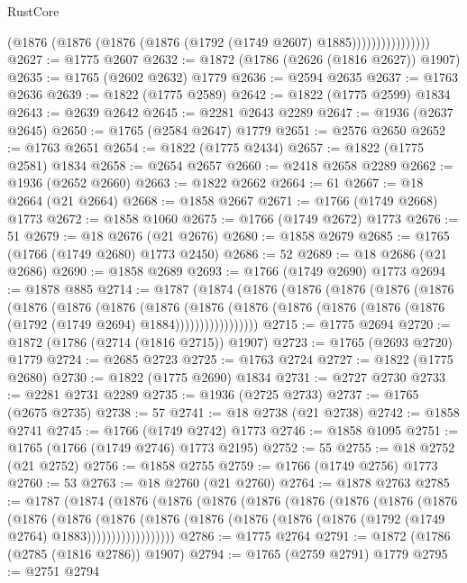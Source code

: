 \begin{lexlean}{RustCore}
\begin{coremodule}
                          (@1876 (@1876 (@1876 (@1876 (@1792 (@1749 @2607) @1885))))))))))))))))
@2627 := @1775 @2607
@2632 := @1872 (@1786 (@2626 (@1816 @2627)) @1907)
@2635 := @1765 (@2602 @2632) @1779
@2636 := @2594 @2635
@2637 := @1763 @2636
@2639 := @1822 (@1775 @2589)
@2642 := @1822 (@1775 @2599) @1834
@2643 := @2639 @2642
@2645 := @2281 @2643 @2289
@2647 := @1936 (@2637 @2645)
@2650 := @1765 (@2584 @2647) @1779
@2651 := @2576 @2650
@2652 := @1763 @2651
@2654 := @1822 (@1775 @2434)
@2657 := @1822 (@1775 @2581) @1834
@2658 := @2654 @2657
@2660 := @2418 @2658 @2289
@2662 := @1936 (@2652 @2660)
@2663 := @1822 @2662
@2664 := 61
@2667 := @18 @2664 (@21 @2664)
@2668 := @1858 @2667
@2671 := @1766 (@1749 @2668) @1773
@2672 := @1858 @1060
@2675 := @1766 (@1749 @2672) @1773
@2676 := 51
@2679 := @18 @2676 (@21 @2676)
@2680 := @1858 @2679
@2685 := @1765 (@1766 (@1749 @2680) @1773 @2450)
@2686 := 52
@2689 := @18 @2686 (@21 @2686)
@2690 := @1858 @2689
@2693 := @1766 (@1749 @2690) @1773
@2694 := @1878 @885
@2714 := @1787
    (@1874
      (@1876
        (@1876
          (@1876
            (@1876
              (@1876
                (@1876
                  (@1876
                    (@1876
                      (@1876
                        (@1876
                          (@1876
                            (@1876 (@1876 (@1876 (@1876 (@1792 (@1749 @2694) @1884)))))))))))))))))
@2715 := @1775 @2694
@2720 := @1872 (@1786 (@2714 (@1816 @2715)) @1907)
@2723 := @1765 (@2693 @2720) @1779
@2724 := @2685 @2723
@2725 := @1763 @2724
@2727 := @1822 (@1775 @2680)
@2730 := @1822 (@1775 @2690) @1834
@2731 := @2727 @2730
@2733 := @2281 @2731 @2289
@2735 := @1936 (@2725 @2733)
@2737 := @1765 (@2675 @2735)
@2738 := 57
@2741 := @18 @2738 (@21 @2738)
@2742 := @1858 @2741
@2745 := @1766 (@1749 @2742) @1773
@2746 := @1858 @1095
@2751 := @1765 (@1766 (@1749 @2746) @1773 @2195)
@2752 := 55
@2755 := @18 @2752 (@21 @2752)
@2756 := @1858 @2755
@2759 := @1766 (@1749 @2756) @1773
@2760 := 53
@2763 := @18 @2760 (@21 @2760)
@2764 := @1878 @2763
@2785 := @1787
    (@1874
      (@1876
        (@1876
          (@1876
            (@1876
              (@1876
                (@1876
                  (@1876
                    (@1876
                      (@1876
                        (@1876
                          (@1876
                            (@1876
                              (@1876
                                (@1876 (@1876 (@1876 (@1792 (@1749 @2764) @1883))))))))))))))))))
@2786 := @1775 @2764
@2791 := @1872 (@1786 (@2785 (@1816 @2786)) @1907)
@2794 := @1765 (@2759 @2791) @1779
@2795 := @2751 @2794

\end{coremodule}
\end{lexlean}
